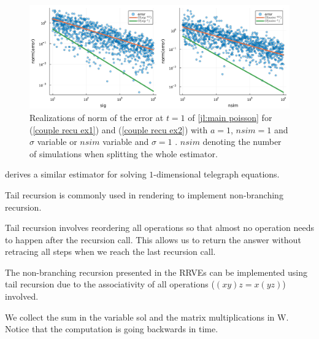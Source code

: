 \documentclass[a4paper,12pt]{article}
\begin{document}
\begin{figure}[h!]
  \centering
  \includegraphics[width=\textwidth]{julia_plots/main_poisson_convergence.pdf}
  \caption{Realizations of norm of the error at $t=1$ of \ref{jl:main poisson} for (\ref{couple recu ex1}) and (\ref{couple recu ex2}) with $a=1$,
    $nsim =1$ and $\sigma$ variable or $nsim$ variable and $\sigma = 1$ . $nsim$ denoting the number of simulations
    when splitting the whole estimator.}
  \label{fig:main poisson convergence}
\end{figure}

\begin{related}
  \cite{acebron_monte_2016} derives a similar estimator for solving
  $1$-dimensional telegraph equations.
\end{related}

Tail recursion is commonly used in rendering to implement non-branching recursion.

\begin{technique}
  Tail recursion involves reordering all operations
  so that almost no operation needs to happen after
  the recursion call. This allows us to return the
  answer without retracing all steps when we reach
  the last recursion call.
\end{technique}

The non-branching recursion presented in the RRVEs can
be implemented using tail recursion due to the associativity
of all operations ($(xy)z = x(yz)$) involved.

\begin{julia}
  We collect the sum in the variable sol and the matrix multiplications in W.
  Notice that the computation is going backwards in time.

\end{julia}
\end{document}
